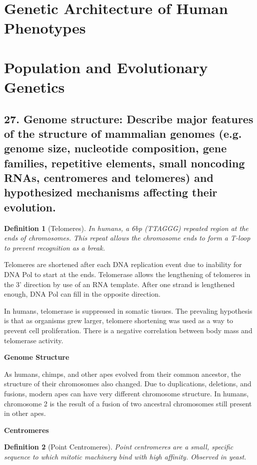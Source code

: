 \documentclass{tufte-handout}
\theoremstyle{noparens}
\newtheorem*{define}{Definition}
\begin{document}
\newpage
\section{Genetic Architecture of Human Phenotypes}\label{sec:genarch}

\section{Population and Evolutionary Genetics}\label{sec:popgen}

\subsection{27.
Genome structure: Describe major features of the structure of mammalian genomes (e.g. 
genome size, nucleotide composition, gene families, repetitive elements, small noncoding RNAs, centromeres and telomeres) and hypothesized mechanisms affecting their evolution.}

\begin{define}[Telomeres]
In humans, a 6bp (TTAGGG) repeated region at the ends of chromosomes. This repeat allows the chromosome ends to form a T-loop to prevent recognition as a break.
\end{define}

Telomeres are shortened after each DNA replication event due to inability for DNA Pol to start at the ends. Telomerase allows the lengthening of telomeres in the 3' direction by use of an RNA template. After one strand is lengthened enough, DNA Pol can fill in the opposite direction.

In humans, telomerase is suppressed in somatic tissues. The prevaling hypothesis is that as organisms grew larger, telomere shortening was used as a way to prevent cell proliferation. There is a negative correlation between body mass and telomerase activity.

\textbf{Genome Structure}

As humans, chimps, and other apes evolved from their common ancestor, the structure of their chromosomes also changed. Due to duplications, deletions, and fusions, modern apes can have very different chromosome structure. In humans, chromosome 2 is the result of a fusion of two ancestral chromosomes still present in other apes.

\textbf{Centromeres}

\begin{define}[Point Centromeres]
Point centromeres are a small, specific sequence to which mitotic machinery bind with high affinity. Observed in yeast.
\end{define}
\end{document}
